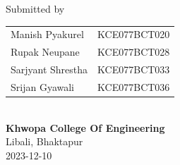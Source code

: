 \begin{center}
		\vspace{0.2in}
		\large{Submitted by}\\
		\vspace{0.1in}
		\begin{tabular}{p{3.5in}p{2in}}
			\hspace{0.3cm}Manish Pyakurel& \hspace{1cm}KCE077BCT020\\
			\hspace{0.3cm}Rupak Neupane& \hspace{1cm}KCE077BCT028\\
			\hspace{0.3cm}Sarjyant Shrestha& \hspace{1cm}KCE077BCT033\\
			\hspace{0.3cm}Srijan Gyawali& \hspace{1cm}KCE077BCT036\\
		\end{tabular}
		\\
		\vspace{1cm}
			\vspace{0.8cm}
		\large{\textbf{Khwopa College Of Engineering}\\}
			\normalsize{Libali, Bhaktapur\\
			2023-12-10
		}
    \end{center}
